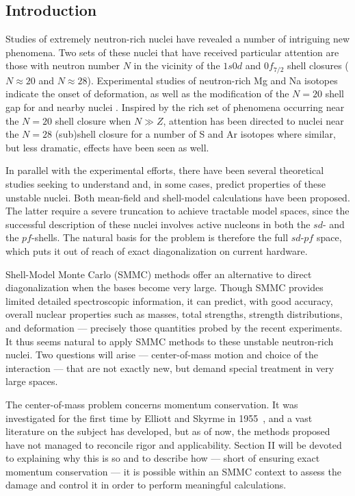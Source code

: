 \begin{multicols}{2}
\section{Introduction}

Studies of extremely neutron-rich nuclei have revealed a number of
intriguing new phenomena.  Two sets of these nuclei that have received
particular attention are those with neutron number $N$ in the vicinity
of the $1s0d$ and $0f_{7/2}$ shell closures ($N \approx 20$ and $N
\approx 28$).  Experimental studies of neutron-rich Mg and Na isotopes
indicate the onset of deformation, as well as the modification of the
$N = 20$ shell gap for  and nearby nuclei \cite{r:motobayashi}.
Inspired by the rich set of phenomena occurring near the $N = 20$
shell closure when $N \gg Z$, attention has been directed to nuclei
near the $N = 28$ (sub)shell closure for a number of S and Ar isotopes
\cite{r:brown1,r:brown2} where similar, but less dramatic, effects
have been seen as well.

In parallel with the experimental efforts, there have been several
theoretical studies seeking to understand and, in some cases, predict
properties of these unstable nuclei.  Both mean-field
\cite{r:werner,r:campi} and shell-model calculations
\cite{r:brown1,r:brown2,r:wbmb,r:poves1,r:fukunishi,r:retamosa,r:caurier}
have been proposed. The latter require a severe truncation to
achieve tractable model spaces, since the successful description of these
nuclei involves active nucleons in both the $sd$- and the $pf$-shells.
The natural basis for the problem is therefore the full $sd$-$pf$
space, which puts it out of reach of exact diagonalization on current
hardware.

Shell-Model Monte Carlo (SMMC) methods
\cite{r:smmc_pr,r:smmc_ar,r:lang} offer an alternative to direct
diagonalization when the bases become very large. Though SMMC provides
limited detailed spectroscopic information, it can predict, with good
accuracy, overall nuclear properties such as masses, total strengths,
strength distributions, and deformation --- precisely those quantities
probed by the recent experiments. It thus seems natural to apply SMMC
methods to these unstable neutron-rich nuclei. Two questions will
arise --- center-of-mass motion and choice of the interaction --- that
are not exactly new, but demand special treatment in very large spaces.

The center-of-mass problem concerns momentum conservation. It
was investigated for the first time by Elliott and Skyrme in
1955~\cite{es}, and a vast literature on the subject has developed,
but as of now, the methods proposed have not managed to reconcile
rigor and applicability. Section II will be devoted to explaining why
this is so and to describe how --- short of ensuring exact momentum
conservation --- it is possible within an SMMC context to assess the
damage and control it in order to perform meaningful calculations.


\end{multicols}

